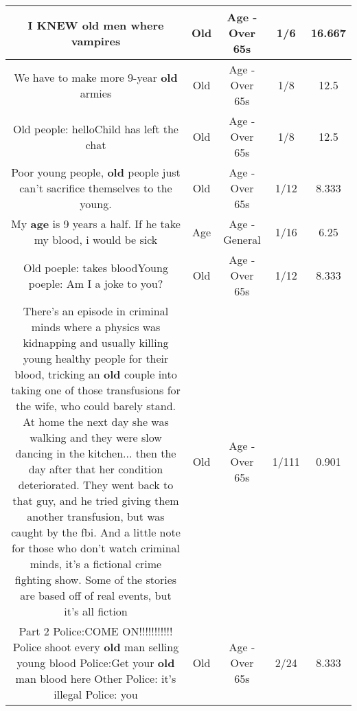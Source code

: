 \documentclass[11pt]{article}
\newlength\mylength
\begin{document}
\begin{center}
\begin{longtable}{|C{.65\mylength}|C{.30\mylength}|C{.12\mylength}|C{.12\mylength}|C{.12\mylength}|}
  \small I KNEW \textbf{old} men where vampires\normalsize   & Old & Age - Over 65s & 1/6 & 16.667 \\  \hline
  \small We have to make more 9-year \textbf{old} armies\normalsize   & Old & Age - Over 65s & 1/8 & 12.5 \\  \hline
  \small Old people: helloChild has left the chat\normalsize   & Old & Age - Over 65s & 1/8 & 12.5 \\  \hline
  \small Poor young people, \textbf{old} people just can't sacrifice themselves to the young.\normalsize   & Old & Age - Over 65s & 1/12 & 8.333 \\  \hline
  \small My \textbf{age} is 9 years a half. If he take my blood, i would be sick\normalsize   & Age & Age - General & 1/16 & 6.25 \\  \hline
  \small Old poeple: takes bloodYoung poeple: Am I a joke to you?\normalsize   & Old & Age - Over 65s & 1/12 & 8.333 \\  \hline
  \small There's an episode in criminal minds where a physics was kidnapping and usually killing young healthy people for their blood, tricking an \textbf{old} couple into taking one of those transfusions for the wife, who could barely stand. At home the next day she was walking and they were slow dancing in the kitchen... then the day after that her condition deteriorated. They went back to that guy, and he tried giving them another transfusion, but was caught by the fbi. And a little note for those who don't watch criminal minds, it's a fictional crime fighting show. Some of the stories are based off of real events, but it's all fiction\normalsize   & Old & Age - Over 65s & 1/111 & 0.901 \\  \hline
  \small Part 2  Police:COME ON!!!!!!!!!!! Police shoot every \textbf{old} man selling young blood Police:Get your \textbf{old} man blood here   Other Police: it's illegal    Police:  you\normalsize   & Old & Age - Over 65s & 2/24 & 8.333 \\  \hline

\end{longtable}
\end{center}
\end{document}
